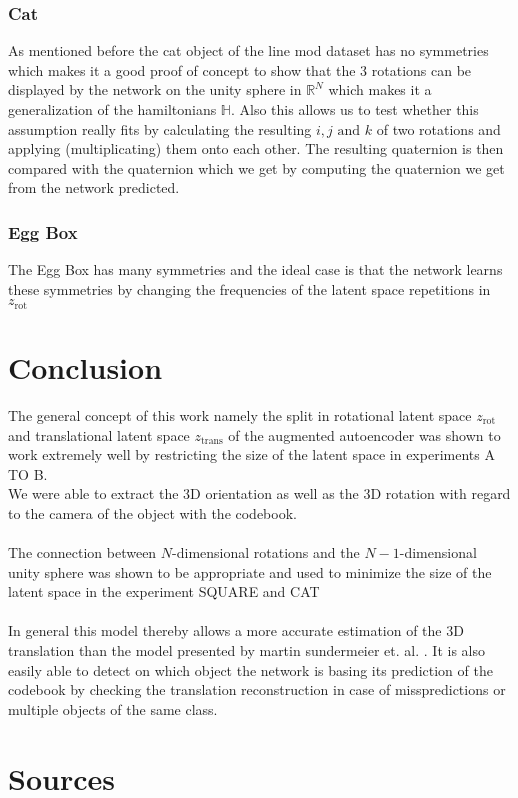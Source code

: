 \documentclass[10pt,a4paper]{article}
\newcommand{\rot}{\ensuremath{\text{rot}\xspace}}
\newcommand{\trans}{\ensuremath{\text{trans}\xspace}}
\begin{document}
\subsubsection{Cat}
As mentioned before the cat object of the line mod dataset has no symmetries which makes it a good proof of concept to show that the 3 rotations can be displayed by the network on the unity sphere in $\mathbb{R}^N$ which makes it a generalization of the hamiltonians $\mathbb{H}$. Also this allows us to test whether this assumption really fits by calculating the resulting $i, j \text{ and } k$ of two rotations and applying (multiplicating) them onto each other. The resulting quaternion is then compared with the quaternion which we get by computing the quaternion we get from the network predicted.

\subsubsection{Egg Box}
The Egg Box has many symmetries and the ideal case is that the network learns these symmetries by changing the frequencies of the latent space repetitions in $z_{\rot}$
\newpage
\section{Conclusion}
The general concept of this work namely the split in rotational latent space $z_{\rot}$ and translational latent space $z_{\trans}$ of the augmented autoencoder was shown to work  extremely well by restricting the size of the latent space in experiments A TO B.\\
We were able to extract the 3D orientation as well as the 3D rotation with regard to the camera of the object with the codebook.\\
\\
The connection between $N$-dimensional rotations and the $N-1$-dimensional unity sphere was shown to be appropriate and used to minimize the size of the latent space in the experiment SQUARE and CAT\\
\\
In general this model thereby allows a more accurate estimation of the 3D translation than the model presented by martin sundermeier et. al. .
It is also easily able to detect on which object the network is basing its prediction of the codebook by checking the translation reconstruction in case of misspredictions or multiple objects of the same class.\\

 

\section{Sources}\label{Sources}
\printbibliography*
\end{document}
